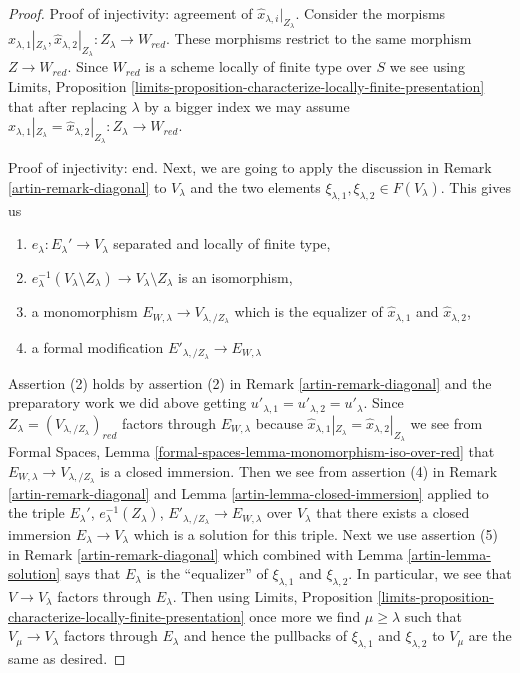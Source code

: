 \begin{proof}
\medskip\noindent
Proof of injectivity: agreement of $\hat x_{\lambda, i}|_{Z_\lambda}$.
Consider the morpisms
$\hat x_{\lambda, 1}|_{Z_\lambda}, \hat x_{\lambda, 2}|_{Z_\lambda} :
Z_\lambda \to W_{red}$.
These morphisms restrict to the same morphism $Z \to W_{red}$.
Since $W_{red}$ is a scheme locally of finite type over $S$
we see using Limits, Proposition
\ref{limits-proposition-characterize-locally-finite-presentation}
that after replacing $\lambda$ by a bigger index
we may assume
$\hat x_{\lambda, 1}|_{Z_\lambda} = \hat x_{\lambda, 2}|_{Z_\lambda} :
Z_\lambda \to W_{red}$.

\medskip\noindent
Proof of injectivity: end.
Next, we are going to apply the discussion in
Remark \ref{artin-remark-diagonal} to $V_\lambda$ and the two elements
$\xi_{\lambda, 1}, \xi_{\lambda, 2} \in F(V_\lambda)$.
This gives us
\begin{enumerate}
\item $e_\lambda : E_\lambda' \to V_\lambda$
separated and locally of finite type,
\item $e_\lambda^{-1}(V_\lambda \setminus Z_\lambda) \to
V_\lambda \setminus Z_\lambda$ is an isomorphism,
\item a monomorphism $E_{W, \lambda} \to V_{\lambda, /Z_\lambda}$
which is the equalizer of $\hat x_{\lambda, 1}$ and $\hat x_{\lambda, 2}$,
\item a formal modification $E'_{\lambda, /Z_\lambda} \to E_{W, \lambda}$
\end{enumerate}
Assertion (2) holds by assertion (2) in Remark \ref{artin-remark-diagonal}
and the preparatory work we did above getting
$u'_{\lambda, 1} = u'_{\lambda, 2} = u'_\lambda$.
Since $Z_\lambda = (V_{\lambda, /Z_\lambda})_{red}$ factors through
$E_{W, \lambda}$ because
$\hat x_{\lambda, 1}|_{Z_\lambda} = \hat x_{\lambda, 2}|_{Z_\lambda}$
we see from
Formal Spaces, Lemma \ref{formal-spaces-lemma-monomorphism-iso-over-red}
that $E_{W, \lambda} \to V_{\lambda, /Z_\lambda}$ is a closed immersion.
Then we see from assertion (4) in Remark \ref{artin-remark-diagonal}
and Lemma \ref{artin-lemma-closed-immersion} applied to the triple
$E_\lambda'$, $e_\lambda^{-1}(Z_\lambda)$,
$E'_{\lambda, /Z_\lambda} \to E_{W, \lambda}$ over $V_\lambda$ that
there exists a closed immersion $E_\lambda \to V_\lambda$
which is a solution for this triple.
Next we use assertion (5) in Remark \ref{artin-remark-diagonal}
which combined with Lemma \ref{artin-lemma-solution}
says that $E_\lambda$ is the ``equalizer'' of $\xi_{\lambda, 1}$
and $\xi_{\lambda, 2}$. In particular, we see that $V \to V_\lambda$
factors through $E_\lambda$. Then using Limits, Proposition
\ref{limits-proposition-characterize-locally-finite-presentation}
once more we find $\mu \geq \lambda$ such that $V_\mu \to V_\lambda$
factors through $E_\lambda$ and hence the pullbacks of
$\xi_{\lambda, 1}$ and $\xi_{\lambda, 2}$ to $V_\mu$ are the same
as desired.


\end{proof}
